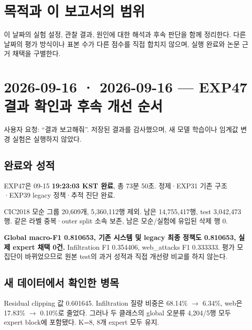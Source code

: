 




\section*{목적과 이 보고서의 범위}

이 날짜의 실험 설정, 관찰 결과, 원인에 대한 해석과 후속 판단을 함께 정리한다. 다른 날짜의 평가 방식이나 표본 수가 다른 점수를 직접 합치지 않으며, 실행 완료와 논문 근거 채택을 구별한다.


\section{2026-09-16 · 2026-09-16 — EXP47 결과 확인과 후속 개선 순서}
\label{report:20260916_0916}
사용자 요청: “결과 보고해줘”. 저장된 결과를 감사했으며, 새 모델 학습이나 임계값 변경 실험은 실행하지 않았다.

\subsection{완료와 성적}
\par\noindent \textbullet\enspace EXP47은 09-15 \textbf{19:23:03 KST 완료}, 총 73분 50초. 정제·EXP31 기존 구조·EXP39 legacy 정책·추적 진단 완료.


\par\noindent \textbullet\enspace CIC2018 모순 그룹 20,609개, 5,360,112행 제외. 남은 14,755,417행, test 3,042,473행. 같은 라벨 중복·outer split 소속 보존, 남은 모순/\allowbreak{}실험에 유입된 삭제 행 0.


\par\noindent \textbullet\enspace \textbf{Global macro-F1 0.810653, 기존 시스템 및 legacy 최종 정책도 0.810653, 실제 expert 채택 0건.} Infiltration F1 0.354406, web\_\allowbreak{}attacks F1 0.333333. 평가 모집단이 바뀌었으므로 원본 test의 과거 성적과 직접 개선량 비교를 하지 않는다.


\subsection{새 데이터에서 확인한 병목}
\par\noindent \textbullet\enspace Residual clipping 값 0.601645. Infiltration 질량 비중은 68.14\% \ensuremath{\rightarrow} 6.34\%, web은 17.83\% \ensuremath{\rightarrow} 0.10\%로 줄었다. 그러나 두 클래스의 global 오분류 4,204/\allowbreak{}5행 모두 expert block에 포함됐다. K=\allowbreak{}8, 8개 expert 모두 유지.


